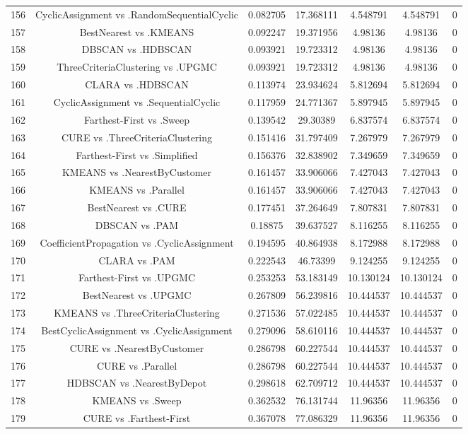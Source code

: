 \documentclass[a4paper,10pt]{article}
\begin{document}
\begin{landscape}
\begin{table}[!htp]
\begin{tabular}{ccccccc}
156&CyclicAssignment vs .RandomSequentialCyclic&0.082705&17.368111&4.548791&4.548791&0\\
157&BestNearest vs .KMEANS&0.092247&19.371956&4.98136&4.98136&0\\
158&DBSCAN vs .HDBSCAN&0.093921&19.723312&4.98136&4.98136&0\\
159&ThreeCriteriaClustering vs .UPGMC&0.093921&19.723312&4.98136&4.98136&0\\
160&CLARA vs .HDBSCAN&0.113974&23.934624&5.812694&5.812694&0\\
161&CyclicAssignment vs .SequentialCyclic&0.117959&24.771367&5.897945&5.897945&0\\
162&Farthest-First vs .Sweep&0.139542&29.30389&6.837574&6.837574&0\\
163&CURE vs .ThreeCriteriaClustering&0.151416&31.797409&7.267979&7.267979&0\\
164&Farthest-First vs .Simplified&0.156376&32.838902&7.349659&7.349659&0\\
165&KMEANS vs .NearestByCustomer&0.161457&33.906066&7.427043&7.427043&0\\
166&KMEANS vs .Parallel&0.161457&33.906066&7.427043&7.427043&0\\
167&BestNearest vs .CURE&0.177451&37.264649&7.807831&7.807831&0\\
168&DBSCAN vs .PAM&0.18875&39.637527&8.116255&8.116255&0\\
169&CoefficientPropagation vs .CyclicAssignment&0.194595&40.864938&8.172988&8.172988&0\\
170&CLARA vs .PAM&0.222543&46.73399&9.124255&9.124255&0\\
171&Farthest-First vs .UPGMC&0.253253&53.183149&10.130124&10.130124&0\\
172&BestNearest vs .UPGMC&0.267809&56.239816&10.444537&10.444537&0\\
173&KMEANS vs .ThreeCriteriaClustering&0.271536&57.022485&10.444537&10.444537&0\\
174&BestCyclicAssignment vs .CyclicAssignment&0.279096&58.610116&10.444537&10.444537&0\\
175&CURE vs .NearestByCustomer&0.286798&60.227544&10.444537&10.444537&0\\
176&CURE vs .Parallel&0.286798&60.227544&10.444537&10.444537&0\\
177&HDBSCAN vs .NearestByDepot&0.298618&62.709712&10.444537&10.444537&0\\
178&KMEANS vs .Sweep&0.362532&76.131744&11.96356&11.96356&0\\
179&CURE vs .Farthest-First&0.367078&77.086329&11.96356&11.96356&0\\

\end{tabular}
\end{table}
\end{landscape}
\end{document}
